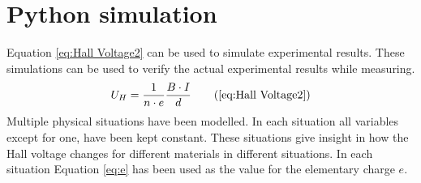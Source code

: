 \section{Python simulation}
Equation \ref{eq:Hall Voltage2} can be used to simulate experimental results. These simulations can be used to verify the actual experimental results while measuring.
    \begin{equation}
        U_H = \frac{1}{n \cdot e} \frac{B \cdot I}{d} \tag{\ref{eq:Hall Voltage2}}
    \end{equation}
Multiple physical situations have been modelled. In each situation all variables except for one, have been kept constant. These situations give insight in how the Hall voltage changes for different materials in different situations. In each situation Equation \ref{eq:e} has been used as the value for the elementary charge $e$.